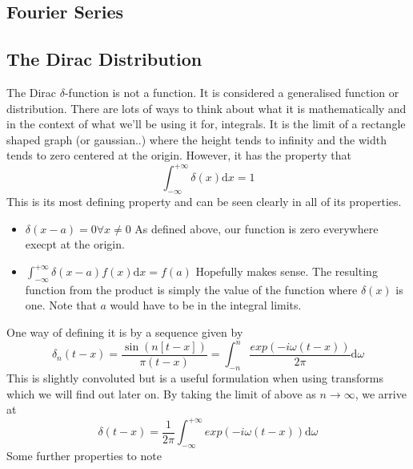 \subsection{Fourier Series} %




\subsection{The Dirac Distribution}
The Dirac $\delta$-function is not a function. It is considered a generalised function or distribution. There are lots of ways to think about what it is mathematically and in the context of what we'll be using it for, integrals.
It is the limit of a rectangle shaped graph (or gaussian..) where the height tends to infinity and the width tends to zero centered at the origin. However, it has the property that
\begin{equation}
\int_{-\infty}^{+\infty} \! \delta(x) \textrm{d}x = 1 
\end{equation}
This is its most defining property and can be seen clearly in all of its properties.
\begin{itemize}
\item \begin{math}\delta(x - a) = 0 \forall x \neq 0\end{math} As defined above, our function is zero everywhere execpt at the origin.
\item \begin{math} \int_{-\infty}^{+\infty} \! \delta(x-a)f(x) \textrm{d}x = f(a) \end{math} Hopefully makes sense. The resulting function from the product is simply the value of the function where $\delta(x)$ is one. Note that $a$ would have to be in the integral limits. 
\end{itemize}
One way of defining it is by a sequence given by
\begin{equation}
\delta_{n}(t-x) = \frac{\sin(n[t-x])}{\pi(t-x)} = \int_{-n}^{n} \! \frac{exp(-i\omega(t-x))}{2\pi} \textrm{d}\omega 
\end{equation}
This is slightly convoluted but is a useful formulation when using transforms which we will find out later on. By taking the limit of above as $n \to \infty$, we arrive at 
\begin{equation}
\delta(t-x) = \frac{1}{2\pi} \int_{-\infty}^{+\infty} \! exp(-i\omega(t-x)) \textrm{d}\omega
\end{equation}
Some further properties to note 
